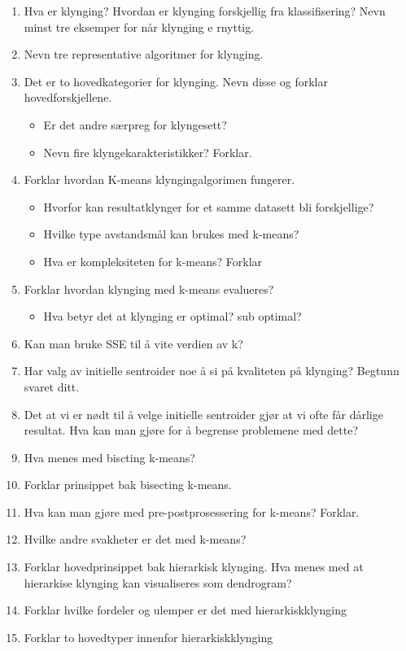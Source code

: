 		\begin{enumerate}
			\item Hva er klynging? Hvordan er klynging forskjellig fra klassifisering? Nevn minst tre 
			eksemper for når klynging e rnyttig.
			\item Nevn tre representative algoritmer for klynging.
			\item Det er to hovedkategorier for klynging. Nevn disse og forklar hovedforskjellene. 
				\begin{itemize}
					\item Er det andre særpreg for klyngesett?
					\item Nevn fire klyngekarakteristikker? Forklar. 
				\end{itemize}
			\item Forklar hvordan K-means klyngingalgorimen fungerer.
				\begin{itemize}
					\item Hvorfor kan resultatklynger for et samme datasett bli forskjellige?
					\item Hvilke type avstandsmål kan brukes med k-means?
					\item Hva er kompleksiteten for k-means? Forklar 
				\end{itemize}
			\item Forklar hvordan klynging med k-means evalueres?
				\begin{itemize}
					\item Hva betyr det at klynging er optimal? sub optimal? 
				\end{itemize}
			\item Kan man bruke SSE til å vite verdien av k? 
			\item Har valg av initielle sentroider noe å si på kvaliteten på klynging? Begtunn svaret ditt. 
			\item Det at vi er nødt til å velge initielle sentroider gjør at vi ofte får dårlige resultat. 
			Hva kan man gjøre for å begrense problemene med dette?
			\item Hva menes med biscting k-means?
			\item Forklar prinsippet bak bisecting k-means. 
			\item Hva kan man gjøre med pre-postprosessering for k-means? Forklar. 
			\item Hvilke andre svakheter er det med k-means?
			\item Forklar hovedprinsippet bak hierarkisk klynging. Hva menes med at hierarkise klynging 
			kan visualiseres som dendrogram? 
			\item Forklar hvilke fordeler og ulemper er det med hierarkiskklynging
			\item Forklar to hovedtyper innenfor hierarkiskklynging
		\end{enumerate}

